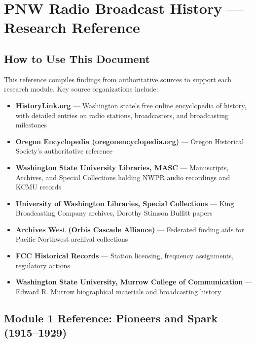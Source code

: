 \documentclass[11pt,letterpaper]{article}
\newcommand{\stageheader}[2]{%
  \noindent\colorbox{#2}{\makebox[\textwidth][l]{%
    \textcolor{white}{\bfseries\sffamily\hspace{6pt}#1\hspace{6pt}}}}%
  \vspace{0.5em}\par%
}
\begin{document}
\newpage

\stageheader{STAGE 2 --- RESEARCH REFERENCE}{secondary}

\section{PNW Radio Broadcast History --- Research Reference}

\subsection{How to Use This Document}

This reference compiles findings from authoritative sources to support each research module. Key source organizations include:

\begin{itemize}[leftmargin=2em]
\item \textbf{HistoryLink.org} --- Washington state's free online encyclopedia of history, with detailed entries on radio stations, broadcasters, and broadcasting milestones
\item \textbf{Oregon Encyclopedia (oregonencyclopedia.org)} --- Oregon Historical Society's authoritative reference
\item \textbf{Washington State University Libraries, MASC} --- Manuscripts, Archives, and Special Collections holding NWPR audio recordings and KCMU records
\item \textbf{University of Washington Libraries, Special Collections} --- King Broadcasting Company archives, Dorothy Stimson Bullitt papers
\item \textbf{Archives West (Orbis Cascade Alliance)} --- Federated finding aids for Pacific Northwest archival collections
\item \textbf{FCC Historical Records} --- Station licensing, frequency assignments, regulatory actions
\item \textbf{Washington State University, Murrow College of Communication} --- Edward R. Murrow biographical materials and broadcasting history
\end{itemize}

\subsection{Module 1 Reference: Pioneers and Spark (1915--1929)}
\end{document}
